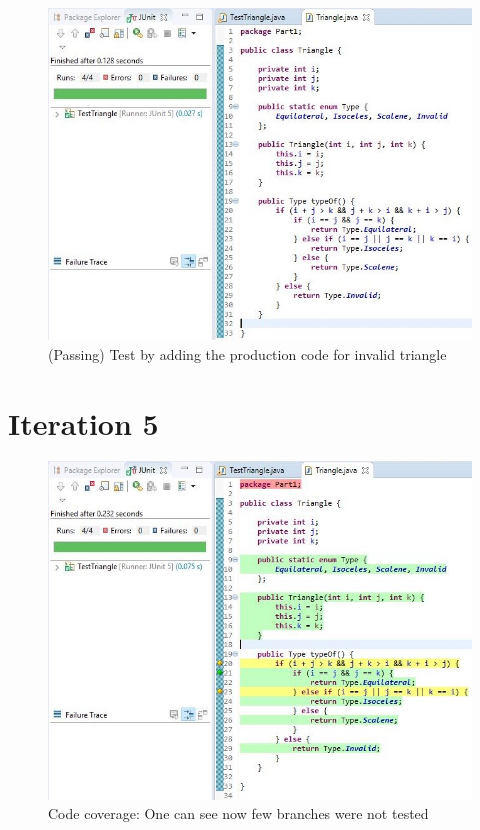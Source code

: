 \documentclass[9pt]{article}
\begin{document}
\begin{figure}[htb]
    \includegraphics[width=\linewidth]{./pics/p8.JPG}
    \caption{(Passing) Test by adding the production code for invalid triangle}
\end{figure}

\clearpage{}

\section{Iteration 5}

\begin{figure}[htb]
    \includegraphics[width=\linewidth]{./pics/p9.JPG}
    \caption{Code coverage: One can see now few branches were not tested}
\end{figure}
\end{document}
